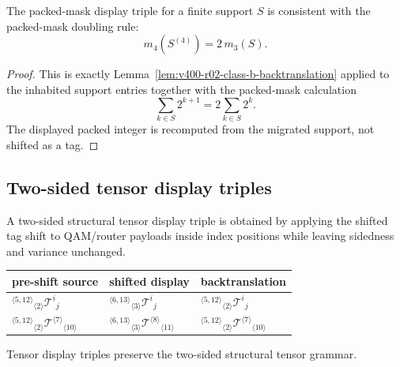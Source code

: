 \begin{lemma}
\label{lem:v400-r03-packed-mask-display-consistency}
The packed-mask display triple for a finite support $S$ is consistent with the
packed-mask doubling rule:
\[
 m_4(S^{(4)})=2\,m_3(S).
\]
\end{lemma}

\begin{proof}
This is exactly Lemma~\ref{lem:v400-r02-class-b-backtranslation} applied to the
inhabited support entries together with the packed-mask calculation
\[
 \sum_{k\in S}2^{k+1}=2\sum_{k\in S}2^k.
\]
The displayed packed integer is recomputed from the migrated support, not
shifted as a tag.
\end{proof}

\subsection{Two-sided tensor display triples}
\label{subsec:v400-r03-two-sided-tensor-display-triples}

\begin{definition}
\label{def:v400-r03-tensor-display-triple}
A two-sided structural tensor display triple is obtained by applying the shifted
tag shift to QAM/router payloads inside index positions while leaving sidedness
and variance unchanged.
\end{definition}

\begin{center}
\tiny
\setlength{\tabcolsep}{1.5pt}
\begin{tabular}{@{}p{}P{0.29\textwidth}P{0.29\textwidth}@{}}
\toprule
pre-shift source & shifted display & backtranslation\\
\midrule
${}^{\langle 5,12\rangle}{}_{\langle 2\rangle}\mathcal T^{i}{}_{j}$
&
${}^{\langle 6,13\rangle}{}_{\langle 3\rangle}\mathcal T^{i}{}_{j}$
&
${}^{\langle 5,12\rangle}{}_{\langle 2\rangle}\mathcal T^{i}{}_{j}$
\\[0.6em]
${}^{\langle 5,12\rangle}{}_{\langle 2\rangle}\mathcal T^{\langle 7\rangle}{}_{\langle 10\rangle}$
&
${}^{\langle 6,13\rangle}{}_{\langle 3\rangle}\mathcal T^{\langle 8\rangle}{}_{\langle 11\rangle}$
&
${}^{\langle 5,12\rangle}{}_{\langle 2\rangle}\mathcal T^{\langle 7\rangle}{}_{\langle 10\rangle}$
\\
\bottomrule
\end{tabular}
\end{center}

\begin{proposition}
\label{prop:v400-r03-display-triples-preserve-tensor-grammar}
Tensor display triples preserve the two-sided structural tensor grammar.
\end{proposition}

